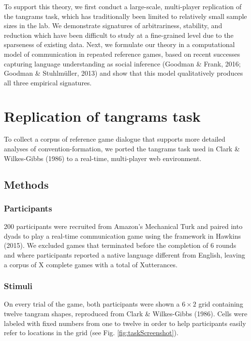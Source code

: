 \documentclass[manuscript]{stjour}
\begin{document}
To support this theory, we first conduct a large-scale, multi-player
replication of the tangrams task, which has traditionally been limited
to relatively small sample sizes in the lab. We demonstrate signatures
of arbitrariness, stability, and reduction which have been difficult to
study at a fine-grained level due to the sparseness of existing data.
Next, we formulate our theory in a computational model of communication
in repeated reference games, based on recent successes capturing
language understanding as social inference (Goodman \& Frank, 2016;
Goodman \& Stuhlmüller, 2013) and show that this model qualitatively
produces all three empirical signatures.

\section{Replication of tangrams
task}\label{replication-of-tangrams-task}

To collect a corpus of reference game dialogue that supports more
detailed analyses of convention-formation, we ported the tangrams task
used in Clark \& Wilkes-Gibbs (1986) to a real-time, multi-player web
environment.

\subsection{Methods}\label{methods}

\subsubsection{Participants}\label{participants}

200 participants were recruited from Amazon's Mechanical Turk and paired
into dyads to play a real-time communication game using the framework in
Hawkins (2015). We excluded games that terminated before the completion
of 6 rounds and where participants reported a native language different
from English, leaving a corpus of X complete games with a total of
Xutterances.

\subsubsection{Stimuli}\label{stimuli}

On every trial of the game, both participants were shown a
\(6 \times 2\) grid containing twelve tangram shapes, reproduced from
Clark \& Wilkes-Gibbs (1986). Cells were labeled with fixed numbers from
one to twelve in order to help participants easily refer to locations in
the grid (see Fig. \ref{fig:taskScreenshot}).
\end{document}
